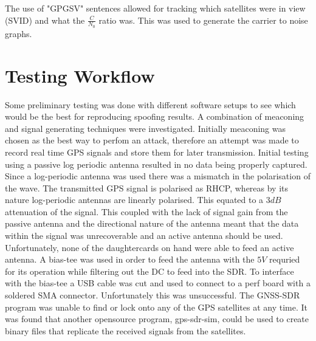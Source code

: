 The use of "GPGSV" sentences allowed for tracking which satellites were in view (SVID) and what the $\frac{C}{N_0}$ ratio was. This was used to generate the carrier to
noise graphs.

\section{Testing Workflow}

Some preliminary testing was done with different software setups to see which would be the best for reproducing spoofing results. A combination of meaconing and signal
generating techniques were investigated. Initially meaconing was chosen as the best way to perfom an attack, therefore an attempt was made to record real time GPS signals
and store them for later transmission. Initial testing using a passive log periodic antenna resulted in no data being properly captured. Since a log-periodic antenna was
used there was a mismatch in the polarisation of the wave. The transmitted GPS signal is polarised as RHCP, whereas by its nature log-periodic antennas are linearly
polarised. This equated to a $3dB$ attenuation of the signal. This coupled with the lack of signal gain from the passive antenna and the directional nature of the antenna
meant that the data within the signal was unrecoverable and an active antenna should be used. Unfortunately, none of the daughtercards on hand were able to feed an active
antenna. A bias-tee was used in order to feed the antenna with the $5V$ requried for its operation while filtering out the DC to feed into the SDR. To interface with the
bias-tee a USB cable was cut and used to connect to a perf board with a soldered SMA connector. Unfortunately this was unsuccessful. The GNSS-SDR program was unable to
find or lock onto any of the GPS satellites at any time. It was found that another opensource program, gps-sdr-sim, could be used to create binary files that replicate
the received signals from the satellites. 


